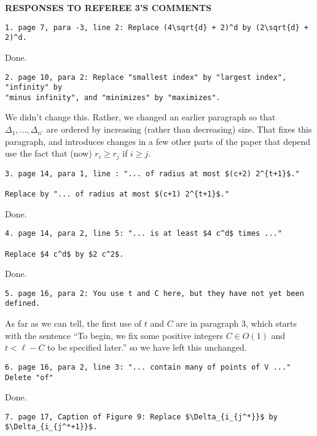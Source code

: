 \documentclass{patmorin}
\begin{document}
\centerline{\large\sffamily\bfseries\MakeUppercase{Responses to Referee 3's Comments}}

\begin{verbatim}
1. page 7, para -3, line 2: Replace (4\sqrt{d} + 2)^d by (2\sqrt{d} + 2)^d.
\end{verbatim}

Done.

\begin{verbatim}
2. page 10, para 2: Replace "smallest index" by "largest index", "infinity" by
"minus infinity", and "minimizes" by "maximizes".
\end{verbatim}

We didn't change this. Rather, we changed an earlier paragraph so that $\Delta_1,...,\Delta_{n'}$ are ordered by increasing (rather than decreasing) size.  That fixes this paragraph, and introduces changes in a few other parts of the paper that depend use the fact that (now) $r_i \ge r_j$ if $i \ge j$.

\begin{verbatim}
3. page 14, para 1, line : "... of radius at most $(c+2) 2^{t+1}$."

Replace by "... of radius at most $(c+1) 2^{t+1}$."
\end{verbatim}

Done.

\begin{verbatim}
4. page 14, para 2, line 5: "... is at least $4 c^d$ times ..."

Replace $4 c^d$ by $2 c^2$.
\end{verbatim}

Done. 

\begin{verbatim}
5. page 16, para 2: You use t and C here, but they have not yet been defined.
\end{verbatim}

As far as we can tell, the first use of $t$ and $C$ are in paragraph 3, which starts with the sentence
``To begin, we fix some positive integers $C \in O(1)$ and $t < \ell - C$ to be specified later.'' so we have left this unchanged. 

\begin{verbatim}
6. page 16, para 2, line 3: "... contain many of points of V ..."
Delete "of"
\end{verbatim}

Done.

\begin{verbatim}
7. page 17, Caption of Figure 9: Replace $\Delta_{i_{j^*}}$ by $\Delta_{i_{j^*+1}}$.
\end{verbatim}
\end{document}
